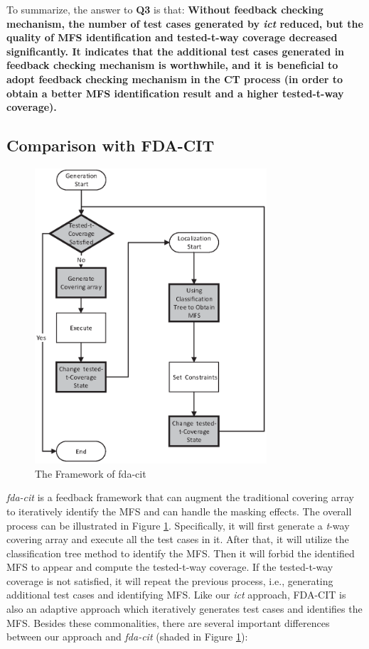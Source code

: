 \documentclass[journal,12pt,onecolumn,draftclsnofoot,]{IEEEtran}
\begin{document}
To summarize, the answer to \textbf{Q3} is that:
\textbf{Without feedback  checking mechanism, the number of test cases generated by \emph{ict} reduced, but the quality of MFS identification and tested-t-way coverage decreased significantly. It indicates that the additional test cases generated in feedback  checking mechanism is worthwhile, and it is beneficial to adopt feedback checking mechanism in the CT process (in order to obtain a better MFS identification result and a higher tested-t-way coverage).
}
%


\subsection{Comparison with FDA-CIT}\label{sec:emprical:CompareFDA}
\begin{figure}[ht]
 \includegraphics[width=3.4in]{fd-cit.eps}
\caption{The Framework of fda-cit}
\label{fda-cit-life}
\end{figure}
\emph{fda-cit} \cite{yilmaz2013reducing} is a feedback framework that can augment the traditional covering array to iteratively identify the MFS and can handle the masking effects. The overall process can be illustrated in Figure \ref{fda-cit-life}. Specifically, it will first generate a \emph{t}-way covering array and execute all the test cases in it. After that, it will utilize the classification tree method to identify the MFS. Then it will forbid the identified MFS to appear and compute the tested-t-way coverage. If the tested-t-way coverage is not satisfied, it will repeat the previous process, i.e., generating additional test cases and identifying MFS. Like our \emph{ict} approach, FDA-CIT is also an adaptive approach which iteratively generates test cases and identifies the MFS. Besides these commonalities, there are several important differences between our approach and \emph{fda-cit} (shaded in Figure \ref{fda-cit-life}):
\end{document}
